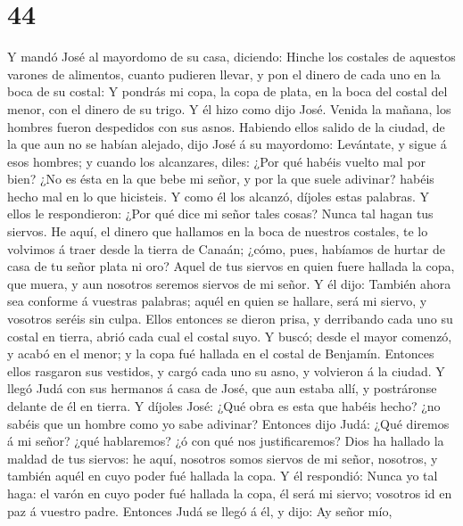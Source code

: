 \hypertarget{section-43}{%
\section{44}\label{section-43}}

 Y mandó José al mayordomo de su casa, diciendo: Hinche los
costales de aquestos varones de alimentos, cuanto pudieren llevar, y pon
el dinero de cada uno en la boca de su costal:  Y pondrás mi
copa, la copa de plata, en la boca del costal del menor, con el dinero
de su trigo. Y él hizo como dijo José.  Venida la mañana,
los hombres fueron despedidos con sus asnos.  Habiendo ellos
salido de la ciudad, de la que aun no se habían alejado, dijo José á su
mayordomo: Levántate, y sigue á esos hombres; y cuando los alcanzares,
diles: ¿Por qué habéis vuelto mal por bien?  ¿No es ésta en
la que bebe mi señor, y por la que suele adivinar? habéis hecho mal en
lo que hicisteis.  Y como él los alcanzó, díjoles estas
palabras.  Y ellos le respondieron: ¿Por qué dice mi señor
tales cosas? Nunca tal hagan tus siervos.  He aquí, el
dinero que hallamos en la boca de nuestros costales, te lo volvimos á
traer desde la tierra de Canaán; ¿cómo, pues, habíamos de hurtar de casa
de tu señor plata ni oro?  Aquel de tus siervos en quien
fuere hallada la copa, que muera, y aun nosotros seremos siervos de mi
señor.  Y él dijo: También ahora sea conforme á vuestras
palabras; aquél en quien se hallare, será mi siervo, y vosotros seréis
sin culpa.  Ellos entonces se dieron prisa, y derribando
cada uno su costal en tierra, abrió cada cual el costal suyo.
 Y buscó; desde el mayor comenzó, y acabó en el menor; y la
copa fué hallada en el costal de Benjamín.  Entonces ellos
rasgaron sus vestidos, y cargó cada uno su asno, y volvieron á la
ciudad.  Y llegó Judá con sus hermanos á casa de José, que
aun estaba allí, y postráronse delante de él en tierra.  Y
díjoles José: ¿Qué obra es esta que habéis hecho? ¿no sabéis que un
hombre como yo sabe adivinar?  Entonces dijo Judá: ¿Qué
diremos á mi señor? ¿qué hablaremos? ¿ó con qué nos justificaremos? Dios
ha hallado la maldad de tus siervos: he aquí, nosotros somos siervos de
mi señor, nosotros, y también aquél en cuyo poder fué hallada la copa.
 Y él respondió: Nunca yo tal haga: el varón en cuyo poder
fué hallada la copa, él será mi siervo; vosotros id en paz á vuestro
padre.  Entonces Judá se llegó á él, y dijo: Ay señor mío,

